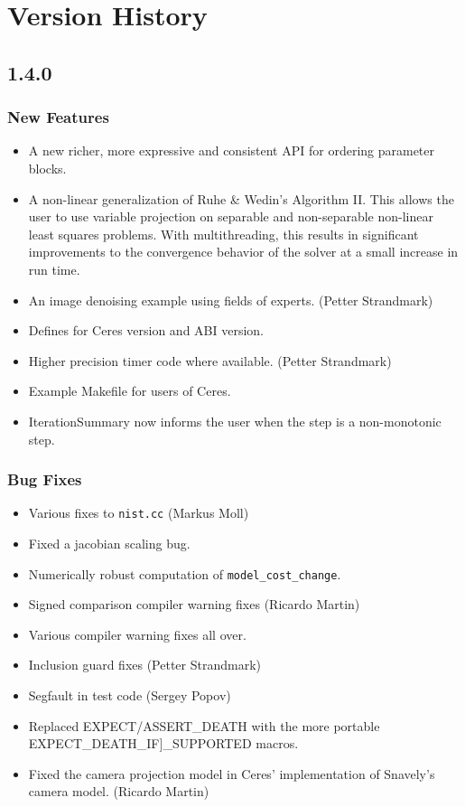 
\chapter{Version History}
\section*{1.4.0}
\subsection{New Features}
\begin{itemize}
\item A new richer, more expressive and consistent API for ordering
  parameter blocks.
\item A non-linear generalization of Ruhe \& Wedin's Algorithm
  II. This allows the user to use variable projection on separable and
  non-separable non-linear least squares problems. With
  multithreading, this results in significant improvements to the
  convergence behavior of the solver at a small increase in run time.
\item An image denoising example using fields of experts. (Petter
  Strandmark)
\item Defines for Ceres version and ABI version.
\item Higher precision timer code where available. (Petter Strandmark)
\item Example Makefile for users of Ceres.
\item IterationSummary now informs the user when the step is a
  non-monotonic step.
\end{itemize}
\subsection{Bug Fixes}
\begin{itemize}
\item Various fixes to \texttt{nist.cc} (Markus Moll)
\item Fixed a jacobian scaling bug.
\item Numerically robust computation of \texttt{model\_cost\_change}.
\item Signed comparison compiler warning fixes (Ricardo Martin)
\item Various compiler warning fixes all over.
\item Inclusion guard fixes (Petter Strandmark)
\item Segfault in test code (Sergey Popov)
\item Replaced EXPECT/ASSERT\_DEATH with the more portable
  EXPECT\_DEATH\_IF]\_SUPPORTED macros.
\item Fixed the camera projection model in Ceres' implementation of
  Snavely's camera model. (Ricardo Martin)
\end{itemize}


